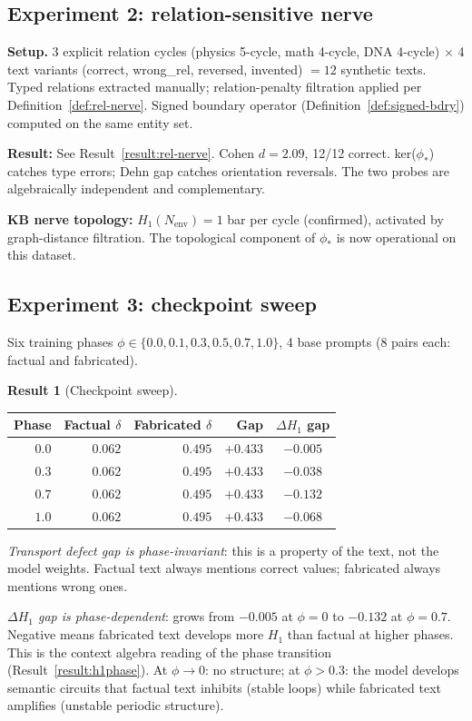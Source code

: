 \documentclass[11pt]{amsart}
\theoremstyle{definition}
\newtheorem{result}[theorem]{Result}
\newcommand{\Nenv}{N_{\mathrm{env}}}
\begin{document}
\subsection{Experiment 2: relation-sensitive nerve}

\textbf{Setup.}
3 explicit relation cycles (physics 5-cycle, math 4-cycle, DNA 4-cycle)
$\times$ 4 text variants (correct, wrong\_rel, reversed, invented)
$= 12$ synthetic texts.
Typed relations extracted manually; relation-penalty filtration applied
per Definition~\ref{def:rel-nerve}.
Signed boundary operator (Definition~\ref{def:signed-bdry}) computed
on the same entity set.

\textbf{Result:} See Result~\ref{result:rel-nerve}.
Cohen $d = 2.09$, 12/12 correct.
ker($\phi_*$) catches type errors; Dehn gap catches orientation reversals.
The two probes are algebraically independent and complementary.

\textbf{KB nerve topology:} $H_1(\Nenv) = 1$ bar per cycle (confirmed),
activated by graph-distance filtration.
The topological component of $\phi_*$ is now operational on this dataset.

\subsection{Experiment 3: checkpoint sweep}

Six training phases $\phi \in \{0.0, 0.1, 0.3, 0.5, 0.7, 1.0\}$,
4 base prompts (8 pairs each: factual and fabricated).

\begin{result}[Checkpoint sweep]
\label{result:checkpoint}
\begin{center}
\begin{tabular}{@{}rrrrc@{}}
\toprule
Phase & Factual $\delta$ & Fabricated $\delta$ & Gap & $\Delta H_1$ gap \\
\midrule
$0.0$ & $0.062$ & $0.495$ & $+0.433$ & $-0.005$ \\
$0.3$ & $0.062$ & $0.495$ & $+0.433$ & $-0.038$ \\
$0.7$ & $0.062$ & $0.495$ & $+0.433$ & $-0.132$ \\
$1.0$ & $0.062$ & $0.495$ & $+0.433$ & $-0.068$ \\
\bottomrule
\end{tabular}
\end{center}
\emph{Transport defect gap is phase-invariant}:
this is a property of the text, not the model weights.
Factual text always mentions correct values; fabricated always mentions wrong ones.

\emph{$\Delta H_1$ gap is phase-dependent}:
grows from $-0.005$ at $\phi=0$ to $-0.132$ at $\phi=0.7$.
Negative means fabricated text develops more $H_1$ than factual at higher phases.
This is the context algebra reading of the phase transition (Result~\ref{result:h1phase}).
At $\phi \to 0$: no structure; at $\phi > 0.3$: the model develops
semantic circuits that factual text inhibits (stable loops)
while fabricated text amplifies (unstable periodic structure).
\end{result}
\end{document}
